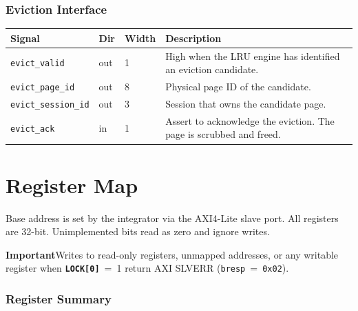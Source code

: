 \documentclass[10pt, a4paper]{article}
\newcommand{\reg}[1]{\texttt{\textbf{#1}}}
\newcommand{\hex}[1]{\texttt{0x#1}}
\newcommand{\portname}[1]{\texttt{#1}}
\newcommand{\notebox}[2][Note]{%
  \vspace{4pt}
  \noindent
  \setlength{\fboxsep}{7pt}
  \setlength{\fboxrule}{0pt}
  \colorbox{heralight}{%
    \parbox{\dimexpr\linewidth-2\fboxsep}{%
      \small\color{heradark}%
      \textbf{\color{heraviolet}#1\enspace}\ignorespaces#2%
    }%
  }%
  \vspace{4pt}%
}
\begin{document}
\subsubsection*{Eviction Interface}

\begin{tabularx}{\linewidth}{L{3.6cm} C{1.2cm} C{1.4cm} X}
\toprule
\textbf{Signal} & \textbf{Dir} & \textbf{Width} & \textbf{Description} \\
\midrule
{}
\portname{evict\_valid}      & out & 1 & High when the LRU engine has identified an eviction candidate. \\
\portname{evict\_page\_id}   & out & 8 & Physical page ID of the candidate. \\
\portname{evict\_session\_id}& out & 3 & Session that owns the candidate page. \\
\portname{evict\_ack}        & in  & 1 & Assert to acknowledge the eviction. The page is scrubbed and freed. \\
\bottomrule
\end{tabularx}

\section{Register Map}

Base address is set by the integrator via the AXI4-Lite slave port. All
registers are 32-bit. Unimplemented bits read as zero and ignore writes.

\notebox[Important]{Writes to read-only registers, unmapped addresses, or any
  writable register when \reg{LOCK[0]}~=~1 return AXI SLVERR
  (\portname{bresp}~=~\hex{02}).}

\subsubsection*{Register Summary}
\end{document}
